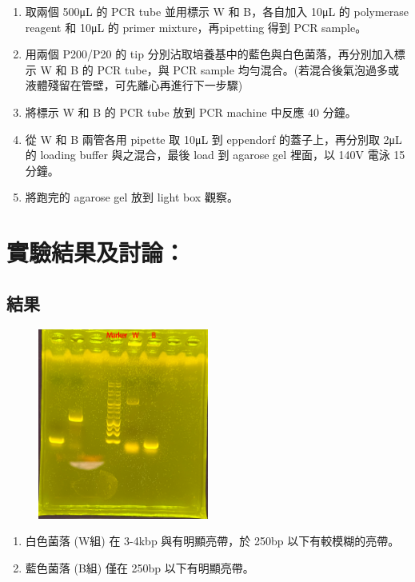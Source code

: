 \begin{enumerate}[label=\arabic*.]
  \item 取兩個 500μL 的 PCR tube 並用標示 W 和 B，各自加入 10μL 的 polymerase reagent 和 10μL 的 primer mixture，再pipetting 得到 PCR sample。
  \item 用兩個 P200/P20 的 tip 分別沾取培養基中的藍色與白色菌落，再分別加入標示 W 和 B 的 PCR tube，與 PCR sample 均勻混合。(若混合後氣泡過多或液體殘留在管壁，可先離心再進行下一步驟)
  \item 將標示 W 和 B 的 PCR tube 放到 PCR machine 中反應 40 分鐘。
  \item 從 W 和 B 兩管各用 pipette 取 10μL 到 eppendorf 的蓋子上，再分別取 2μL 的 loading buffer 與之混合，最後 load 到 agarose gel 裡面，以 140V 電泳 15 分鐘。
  \item 將跑完的 agarose gel 放到 light box 觀察。
  
\end{enumerate}



\newpage
\section*{實驗結果及討論：}
\subsection*{結果}
\begin{figure}[H]
\centering
\includegraphics[width=0.5\textwidth]{paste_src/rt1.png}
\end{figure}

\begin{enumerate}[label=\arabic*.]
  \item 白色菌落 (W組) 在 3-4kbp 與有明顯亮帶，於 250bp 以下有較模糊的亮帶。
  \item 藍色菌落 (B組) 僅在 250bp 以下有明顯亮帶。
\end{enumerate}


